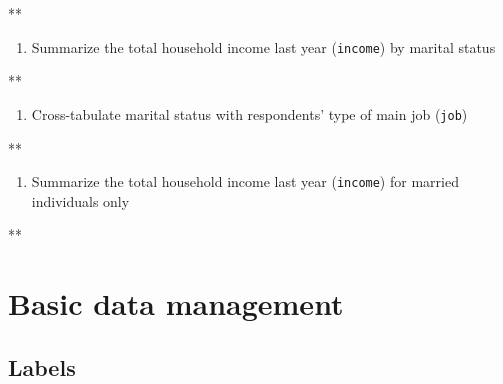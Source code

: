 \documentclass[
]{book}
\newenvironment{Shaded}{\begin{snugshade}}{\end{snugshade}}
\newcommand{\NormalTok}[1]{#1}
\providecommand{\tightlist}{%
  \setlength{\itemsep}{0pt}\setlength{\parskip}{0pt}}
\begin{document}
\begin{Shaded}
\begin{Highlighting}[]
\NormalTok{**}
\end{Highlighting}
\end{Shaded}

\begin{enumerate}
\def\labelenumi{\arabic{enumi}.}
\setcounter{enumi}{3}
\tightlist
\item
  Summarize the total household income last year (\texttt{income}) by marital status
\end{enumerate}

\begin{Shaded}
\begin{Highlighting}[]
\NormalTok{**}
\end{Highlighting}
\end{Shaded}

\begin{enumerate}
\def\labelenumi{\arabic{enumi}.}
\setcounter{enumi}{4}
\tightlist
\item
  Cross-tabulate marital status with respondents' type of main job (\texttt{job})
\end{enumerate}

\begin{Shaded}
\begin{Highlighting}[]
\NormalTok{**}
\end{Highlighting}
\end{Shaded}

\begin{enumerate}
\def\labelenumi{\arabic{enumi}.}
\setcounter{enumi}{5}
\tightlist
\item
  Summarize the total household income last year (\texttt{income}) for married individuals only
\end{enumerate}

\begin{Shaded}
\begin{Highlighting}[]
\NormalTok{**}
\end{Highlighting}
\end{Shaded}

\hypertarget{basic-data-management}{%
\section{Basic data management}\label{basic-data-management}}

\hypertarget{labels}{%
\subsection{Labels}\label{labels}}
\end{document}
